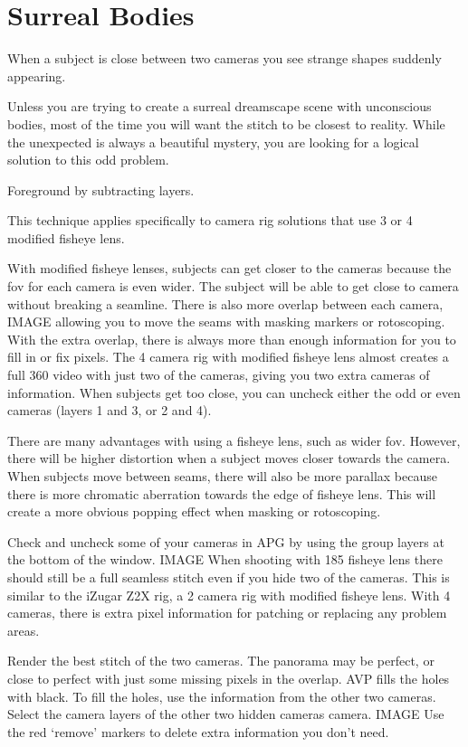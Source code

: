 \chapter{Surreal Bodies}
\pagecolor{white}
\label{chap:39}
\begin{fullwidth}


\problem

{\large When a subject is close between two cameras you see strange shapes suddenly appearing. \par}

Unless you are trying to create a surreal dreamscape scene with unconscious bodies, most of the time you will want the stitch to be closest to reality. While the unexpected is always a beautiful mystery, you are looking for a logical solution to this odd problem.  

\solutions

{\large Foreground by subtracting layers. \par}

This technique applies specifically to camera rig solutions that use 3 or 4 modified fisheye lens.

With modified fisheye lenses, subjects can get closer to the cameras because the fov for each camera is even wider. The subject will be able to get close to camera without breaking a seamline. There is also more overlap between each camera, IMAGE allowing you to move the seams with masking markers or rotoscoping. With the extra overlap, there is always more than enough information for you to fill in or fix pixels. The 4 camera rig with modified fisheye lens almost creates a full 360 video with just two of the cameras, giving you two extra cameras of information. When subjects get too close, you can uncheck either the odd or even cameras (layers 1 and 3, or 2 and 4). 

There are many advantages with using a fisheye lens, such as wider fov. However, there will be higher distortion when a subject moves closer towards the camera. When subjects move between seams, there will also be more parallax because there is more chromatic aberration towards the edge of fisheye lens. This will create a more obvious popping effect when masking or rotoscoping.

Check and uncheck some of your cameras in APG by using the group layers at the bottom of the window. IMAGE When shooting with 185 fisheye lens there should still be a full seamless stitch even if you hide two of the cameras.  This is similar to the iZugar Z2X rig, a 2 camera rig with modified fisheye lens. With 4 cameras, there is extra pixel information for patching or replacing any problem areas. 

Render the best stitch of the two cameras. The panorama may be perfect, or close to perfect with just some missing pixels in the overlap. AVP fills the holes with black. 
To fill the holes, use the information from the other two cameras. Select the camera layers of the other two hidden cameras camera. IMAGE Use the red ‘remove’ markers to delete extra information you don’t need.


\clearpage
\end{fullwidth}
